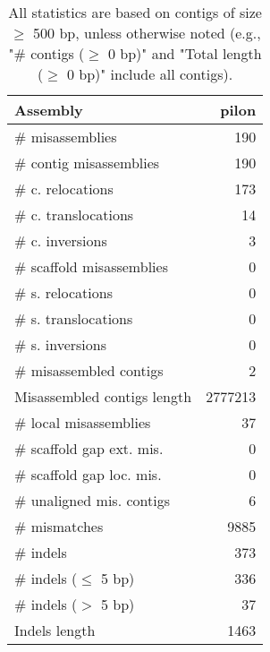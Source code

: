 \documentclass[12pt,a4paper]{article}
\begin{document}
\begin{table}[ht]
\begin{center}
\caption{All statistics are based on contigs of size $\geq$ 500 bp, unless otherwise noted (e.g., "\# contigs ($\geq$ 0 bp)" and "Total length ($\geq$ 0 bp)" include all contigs).}
\begin{tabular}{|l*{1}{|r}|}
\hline
Assembly & pilon \\ \hline
\# misassemblies & 190 \\ \hline
\hspace{2mm}\# contig misassemblies & 190 \\ \hline
\hspace{5mm}\# c. relocations & 173 \\ \hline
\hspace{5mm}\# c. translocations & 14 \\ \hline
\hspace{5mm}\# c. inversions & 3 \\ \hline
\hspace{2mm}\# scaffold misassemblies & 0 \\ \hline
\hspace{5mm}\# s. relocations & 0 \\ \hline
\hspace{5mm}\# s. translocations & 0 \\ \hline
\hspace{5mm}\# s. inversions & 0 \\ \hline
\# misassembled contigs & 2 \\ \hline
Misassembled contigs length & 2777213 \\ \hline
\# local misassemblies & 37 \\ \hline
\# scaffold gap ext. mis. & 0 \\ \hline
\# scaffold gap loc. mis. & 0 \\ \hline
\# unaligned mis. contigs & 6 \\ \hline
\# mismatches & 9885 \\ \hline
\# indels & 373 \\ \hline
\hspace{5mm}\# indels ($\leq$ 5 bp) & 336 \\ \hline
\hspace{5mm}\# indels ($>$ 5 bp) & 37 \\ \hline
Indels length & 1463 \\ \hline
\end{tabular}
\end{center}
\end{table}
\end{document}
